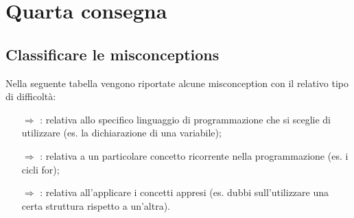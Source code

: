 \chapter{Quarta consegna}

\section{Classificare le misconceptions}

Nella seguente tabella vengono riportate alcune
misconception con il relativo tipo di difficoltà:

\begin{itemize}
    \item [$\Rightarrow$] : relativa allo specifico
    linguaggio di programmazione che si sceglie di utilizzare (es. la dichiarazione di una variabile);
    \item [$\Rightarrow$] : relativa a un particolare concetto
    ricorrente nella programmazione (es. i cicli for);
    \item [$\Rightarrow$] : relativa all'applicare i concetti appresi 
    (es. dubbi sull'utilizzare una certa struttura rispetto a un'altra).
\end{itemize}
